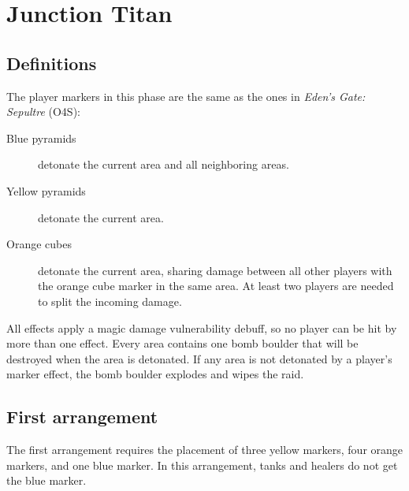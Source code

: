 
\chapter{Junction Titan}
\section{Definitions}

The player markers in this phase are the same as the ones in \emph{Eden's Gate: Sepultre} (O4S):

\begin{description}
    \item [Blue pyramids] detonate the current area and all neighboring areas.
    \item [Yellow pyramids] detonate the current area.
    \item [Orange cubes] detonate the current area, sharing damage between all other players with the orange cube marker in the same area.  At least two players are needed to split the incoming damage.
\end{description}

All effects apply a magic damage vulnerability debuff, so no player can be hit by more than one effect.
Every area contains one bomb boulder that will be destroyed when the area is detonated.  If any area is not detonated by a player's marker effect, the bomb boulder explodes and wipes the raid.

\section{First arrangement}

The first arrangement requires the placement of three yellow markers, four orange markers, and one blue marker.  In this arrangement, tanks and healers do not get the blue marker.

